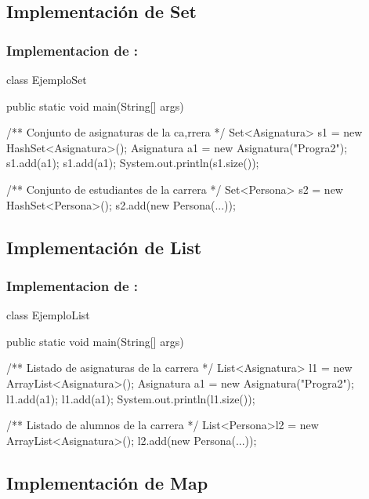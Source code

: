 \documentclass{beamer}
\begin{document}
\subsection{Implementación de Set}

\begin{frame}[fragile]
  \frametitle{Implementacion de : }

  \begin{jsmall}
    class EjemploSet {
      public static void main(String[] args) {
        /** Conjunto de asignaturas de la ca,rrera */        
        Set<Asignatura> s1 = new HashSet<Asignatura>();
        Asignatura a1 = new Asignatura("Progra2");
        s1.add(a1);
        s1.add(a1);
        System.out.println(s1.size());

        /** Conjunto de estudiantes de la carrera */        
        Set<Persona> s2 = new HashSet<Persona>();
        s2.add(new Persona(...));
      }
    }    
  \end{jsmall}

  
\end{frame}

\subsection{Implementación de List}

\begin{frame}[fragile]
  \frametitle{Implementacion de : }

  \begin{jsmall}
    class EjemploList {
      public static void main(String[] args) {
        /** Listado de asignaturas de la carrera */
        List<Asignatura> l1 = new ArrayList<Asignatura>();
        Asignatura a1 = new Asignatura("Progra2");
        l1.add(a1);
        l1.add(a1);
        System.out.println(l1.size());
        
        /** Listado de alumnos de la carrera */
        List<Persona>l2 = new ArrayList<Asignatura>();
        l2.add(new Persona(...));
      }
    }    
  \end{jsmall}
  
\end{frame}

\subsection{Implementación de Map}
\end{document}
